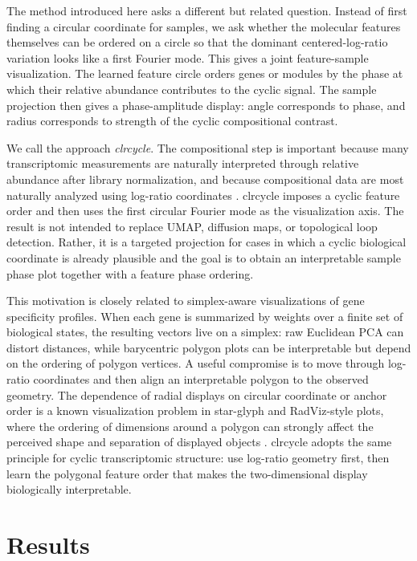 \documentclass[10pt,twocolumn]{article}
\begin{document}
The method introduced here asks a different but related question. Instead of
first finding a circular coordinate for samples, we ask whether the molecular
features themselves can be ordered on a circle so that the dominant
centered-log-ratio variation looks like a first Fourier mode. This gives a joint
feature-sample visualization. The learned feature circle orders genes or modules
by the phase at which their relative abundance contributes to the cyclic signal.
The sample projection then gives a phase-amplitude display: angle corresponds to
phase, and radius corresponds to strength of the cyclic compositional contrast.

We call the approach \emph{clrcycle}. The compositional step is important because many transcriptomic
measurements are naturally interpreted through relative abundance after library
normalization, and because compositional data are most naturally analyzed using
log-ratio coordinates \citep{Aitchison_1982}. clrcycle imposes a cyclic
feature order and then uses the first circular Fourier mode as the visualization
axis. The result is not intended to replace UMAP, diffusion maps, or topological
loop detection. Rather, it is a targeted projection for cases in which a cyclic
biological coordinate is already plausible and the goal is to obtain an
interpretable sample phase plot together with a feature phase ordering.

This motivation is closely related to simplex-aware visualizations of gene
specificity profiles. When each gene is summarized by weights over a finite set
of biological states, the resulting vectors live on a simplex: raw Euclidean
PCA can distort distances, while barycentric polygon plots can be interpretable
but depend on the ordering of polygon vertices. A useful compromise is to move
through log-ratio coordinates and then align an interpretable polygon to the
observed geometry. The dependence of radial displays on circular coordinate or
anchor order is a known visualization problem in star-glyph and RadViz-style
plots, where the ordering of dimensions around a polygon can strongly affect
the perceived shape and separation of displayed objects \citep{Hu_2021,
Zhu_2022}. clrcycle adopts the same principle for cyclic transcriptomic
structure: use log-ratio geometry first, then learn the polygonal feature order
that makes the two-dimensional display biologically interpretable.

\section{Results}
\end{document}

